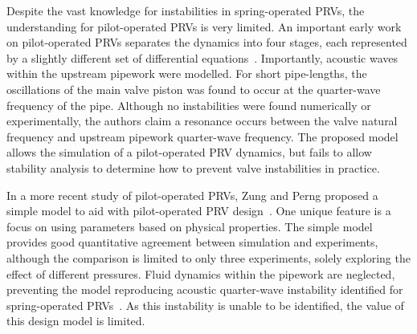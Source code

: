 Despite the vast knowledge for instabilities in spring-operated PRVs, the understanding for pilot-operated PRVs is very limited. An important early work on pilot-operated PRVs separates the dynamics into four stages, each represented by a slightly different set of differential equations~\cite{Botros1997Riser-ReliefInteractions}.
Importantly, acoustic waves within the upstream pipework were modelled.
For short pipe-lengths, the oscillations of the main valve piston was found to occur at the quarter-wave frequency of the pipe. Although no instabilities were found numerically or experimentally, the authors claim a resonance occurs between the valve natural frequency and upstream pipework quarter-wave frequency. %
The proposed model allows the simulation of a pilot-operated PRV dynamics, but fails to allow stability analysis to determine how to prevent valve instabilities in practice.

In a more recent study of pilot-operated PRVs, Zung and Perng proposed a simple model to aid with pilot-operated PRV design~\cite{Zung2002NonlinearDesigners}. One unique feature is a focus on using parameters based on physical properties.
The simple model provides good quantitative agreement between simulation and experiments, although the comparison is limited to only three experiments, solely exploring the effect of different pressures. Fluid dynamics within the pipework are neglected, preventing the model reproducing acoustic quarter-wave instability identified for spring-operated PRVs~\cite{Hos2017DynamicRecommendations}. As this instability is unable to be identified, the value of this design model is limited.

